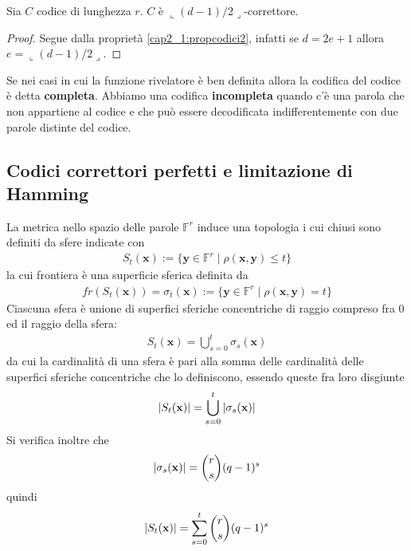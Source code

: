 \begin{prop}\label{cap2_1:propcodici3}
   Sia $C$ codice di lunghezza $r$. $C$ è $\llcorner (d-1)/2 \lrcorner$-correttore.
\end{prop}
\begin{proof}
   Segue dalla proprietà \ref{cap2_1:propcodici2}, infatti se $d=2e+1$ allora $e=\llcorner (d-1)/2 \lrcorner$.
\end{proof}
\noindent
Se nei casi in cui la funzione rivelatore è ben definita allora la codifica del codice è detta {\bf completa}. Abbiamo una codifica {\bf incompleta} quando c'è una parola che non appartiene al codice e che può essere decodificata indifferentemente con due parole distinte del codice.

\subsection{Codici correttori perfetti e limitazione di Hamming}

La metrica nello spazio delle parole $\mathbb{F}^{r}$ induce una topologia i cui chiusi sono definiti da sfere indicate con
\begin{align*}
   S_{t}(\mathbf{x}) := \lbrace \mathbf{y} \in \mathbb{F}^{r} \mid \rho(\mathbf{x},\mathbf{y}) \leq t \rbrace 
\end{align*}
la cui frontiera è una superficie sferica definita da
\begin{align*}
   fr(S_{t}(\mathbf{x})) = \sigma_{t}(\mathbf{x}) 
   := \lbrace \mathbf{y} \in \mathbb{F}^{r} \mid \rho(\mathbf{x},\mathbf{y}) = t \rbrace 
\end{align*}
Ciascuna sfera è unione di superfici sferiche  concentriche di raggio compreso fra $0$ ed il raggio della sfera:
\begin{align*}
   S_{t}(\mathbf{x}) = \bigcup_{s=0}^{t} \sigma_{s}(\mathbf{x}) 
\end{align*}
da cui la cardinalità di una sfera è pari alla somma delle cardinalità delle superfici sferiche concentriche che lo definiscono, essendo queste fra loro disgiunte
\begin{align*}
   \arrowvert S_{t}(\mathbf{x})\arrowvert  = \bigcup_{s=0}^{t} \arrowvert\sigma_{s}(\mathbf{x})\arrowvert 
\end{align*}
Si verifica inoltre che
\begin{align*}
   \arrowvert\sigma_{s}(\mathbf{x})\arrowvert  = \binom{r}{s}(q-1)^{s}
\end{align*} 
quindi
\begin{align*}
   \arrowvert S_{t}(\mathbf{x})\arrowvert  = \sum_{s=0}^{t} \binom{r}{s}(q-1)^{s}
\end{align*}


